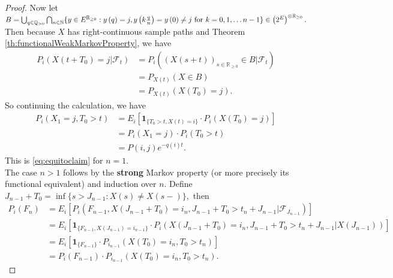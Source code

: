 \documentclass[12pt,a4paper]{scrartcl}
\numberwithin{equation}{section}
\newcommand{\R}{\mathbb{R}} %
\newcommand{\Q}{\mathbb{Q}} %
\newcommand{\N}{\mathbb{N}} %
\begin{document}
\begin{proof}
Now let $B = \bigcup_{q \in \Q_{>0}} \bigcap_{n \in \N} \lbrace y \in E^{\R_{\geq 0}}: y\left(q\right) = j , y\left(k \frac{q}{n} \right) = y\left(0\right) \neq j \textnormal{ for } k=0,1,\ldots n-1 \rbrace  \in \left(2^{E} \right)^{\otimes \R_{\geq 0}}.$
Then because $X$ has right-continuous sample paths and Theorem \ref{th:functionalWeakMarkovProperty}, we have
\begin{align*}
P_i\left(X\left(t+T_0\right) = j |\mathcal{F}_t \right) &= P_i\left(\left(X\left(s+t\right) \right)_{s \in \R_{\geq 0}} \in B |\mathcal{F}_t\right) \\
&= P_{X\left(t\right)}\left(X \in B\right) \\
&=P_{X\left(t\right)}\left(X\left(T_0\right) = j \right).
\end{align*}
So continuing the calculation, we have
\begin{align*}
P_i\left(X_1 = j, T_0 > t\right) &= E_i\left[\textbf{1}_{\lbrace T_0 > t, X\left(t\right) = i\rbrace } \cdot P_i\left(X\left(T_0\right) = j\right) \right] \\
&= P_i\left(X_1 = j \right) \cdot P_i\left(T_0 > t\right) \\
&= P\left(i,j\right) e^{-q\left(i\right)t}.
\end{align*}
This is \eqref{eq:equitoclaim} for $ n = 1 $.\\[2ex]
The case $ n > 1 $ follows by the \textbf{strong} Markov property (or more precisely its functional equivalent) and induction over $n$. Define $ J_{n-1} + T_0 = \inf\lbrace s > J_{n-1}: X\left(s\right) \neq X\left(s-\right)\rbrace ,$ then
\begin{align*}
P_i\left(F_n\right) &= E_i\left[P_i\left(F_{n-1}, X\left( J_{n-1}+T_0\right) = i_n, J_{n-1} + T_0 > t_n + J_{n-1} |\mathcal{F}_{J_{n-1}}\right)\right] \\
& = E_i\left[\textbf{1}_{\lbrace F_{n-1}, X\left(J_{n-1}\right) = i_{n-1}\rbrace } \cdot P_i\left( X\left(J_{n-1}+T_0\right) = i_n, J_{n-1} + T_0 > t_n + J_{n-1} | X\left(J_{n-1}\right)\right)\right] \\
&= E_i\left[\textbf{1}_{\lbrace F_{n-1}\rbrace } \cdot P_{i_{n-1}}\left(X\left(T_0\right) = i_n, T_0 > t_n\right) \right] \\
&= P_i\left(F_{n-1}\right) \cdot P_{i_{n-1}}\left(X\left(T_0\right) = i_n, T_0 > t_n\right).
\end{align*}
\end{proof}
\end{document}
